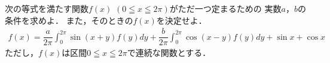 \documentclass[../../main.tex]{subfiles}
\begin{document}
次の等式を満たす関数$f(x)$ $(0 \leqq x \leqq 2\pi)$がただ一つ定まるための
実数$a$，$b$の条件を求めよ．
また，そのときの$f(x)$を決定せよ．
\begin{align*}
  f(x)=\dfrac{a}{2\pi}\int_0^{2\pi}\sin(x+y)f(y)dy+
  \dfrac{b}{2\pi}\int_0^{2\pi}\cos(x-y)f(y)dy+\sin x+\cos x
\end{align*}
ただし，$f(x)$は区間$0 \leqq x \leqq 2\pi$で連続な関数とする．
\end{document}
